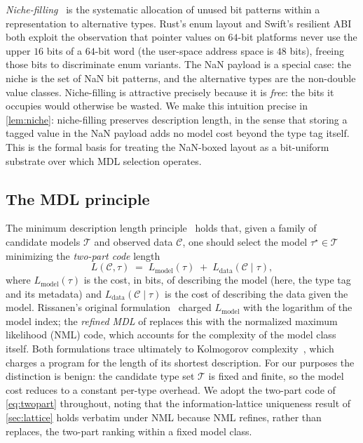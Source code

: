 \documentclass[10pt]{article}
\theoremstyle{definition}
\theoremstyle{remark}
\newcommand{\Ccal}{\mathcal{C}}
\newcommand{\Tcal}{\mathcal{T}}
\newcommand{\Lmodel}{L_{\mathrm{model}}}
\newcommand{\Ldata}{L_{\mathrm{data}}}
\begin{document}
\emph{Niche-filling}~\citep{rustlayout,swiftabi} is the systematic
allocation of unused bit patterns within a representation to alternative
types. Rust's enum layout and Swift's resilient ABI both exploit the
observation that pointer values on $64$-bit platforms never use the upper
$16$ bits of a $64$-bit word (the user-space address space is $48$ bits),
freeing those bits to discriminate enum variants. The NaN payload is a
special case: the niche is the set of NaN bit patterns, and the
alternative types are the non-double value classes. Niche-filling is
attractive precisely because it is \emph{free}: the bits it occupies
would otherwise be wasted. We make this intuition precise in
\cref{lem:niche}: niche-filling preserves description length, in the
sense that storing a tagged value in the NaN payload adds no model cost
beyond the type tag itself. This is the formal basis for treating the
NaN-boxed layout as a bit-uniform substrate over which MDL selection
operates.

\subsection{The MDL principle}\label{sec:mdl}

The minimum description length principle~\citep{rissanen1978,grunwald2004}
holds that, given a family of candidate models $\Tcal$ and observed data
$\Ccal$, one should select the model $\tau^\star \in \Tcal$ minimizing the
\emph{two-part code} length
\begin{equation}\label{eq:twopart}
L(\Ccal, \tau) \;=\; \Lmodel(\tau) \;+\; \Ldata(\Ccal \mid \tau),
\end{equation}
where $\Lmodel(\tau)$ is the cost, in bits, of describing the model (here,
the type tag and its metadata) and $\Ldata(\Ccal \mid \tau)$ is the cost
of describing the data given the model. Rissanen's original
formulation~\citep{rissanen1978} charged $\Lmodel$ with the logarithm of
the model index; the \emph{refined MDL} of \citet{barron1998} replaces
this with the normalized maximum likelihood (NML) code, which accounts for
the complexity of the model class itself. Both formulations trace
ultimately to Kolmogorov complexity~\citep{livitanyi}, which charges a
program for the length of its shortest description. For our purposes the
distinction is benign: the candidate type set $\Tcal$ is fixed and finite,
so the model cost reduces to a constant per-type overhead. We adopt the
two-part code of \cref{eq:twopart} throughout, noting that the
information-lattice uniqueness result of \cref{sec:lattice} holds
verbatim under NML because NML refines, rather than replaces, the
two-part ranking within a fixed model class.
\end{document}
